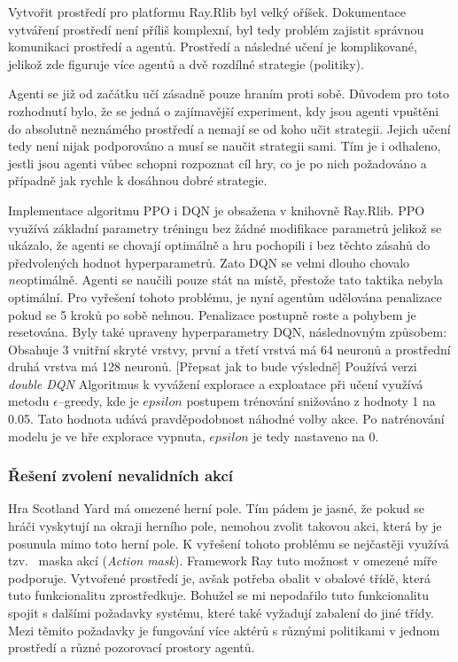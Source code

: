 Vytvořit prostředí pro platformu Ray.Rlib byl velký oříšek.
Dokumentace vytváření prostředí není příliš komplexní, byl tedy problém zajistit správnou komunikaci prostředí a agentů.
Prostředí a následné učení je komplikované, jelikož zde figuruje více agentů a dvě rozdílné strategie (politiky).

Agenti se již od začátku učí zásadně pouze hraním proti sobě.
Důvodem pro toto rozhodnutí bylo, že se jedná o zajímavější experiment, kdy jsou agenti vpuštěni do absolutně neznámého prostředí a nemají se od koho učit strategii.
Jejich učení tedy není nijak podporováno a musí se naučit strategii sami.
Tím je i odhaleno, jestli jsou agenti vůbec schopni rozpoznat cíl hry, co je po nich požadováno a případně jak rychle k dosáhnou dobré strategie.

Implementace algoritmu PPO i DQN je obsažena v knihovně Ray.Rlib.
PPO využívá základní parametry tréningu bez žádné modifikace parametrů jelikož se ukázalo, že agenti se chovají optimálně a hru pochopili i bez těchto zásahů do předvolených hodnot hyperparametrů.
Zato DQN se velmi dlouho chovalo \emph{ne}optimálně.
Agenti se naučili pouze stát na místě, přestože tato taktika nebyla optimální.
Pro vyřešení tohoto problému, je nyní agentům udělována penalizace pokud se 5 kroků po sobě nehnou.
Penalizace postupně roste a pohybem je resetována.
Byly také upraveny hyperparametry DQN, následnovným způsobem:
Obsahuje 3 vnitřní skryté vrstvy, první a třetí vrstvá má 64 neuronů a prostřední druhá vrstva má 128 neuronů.{\color {red} [Přepsat jak to bude výsledně]}
Používá verzi \emph{double DQN}
Algoritmus k vyvážení explorace a exploatace při učení využívá metodu $\epsilon$--greedy, kde je $epsilon$ postupem trénování snižováno z hodnoty 1 na 0.05.
Tato hodnota udává pravděpodobnost náhodné volby akce.
Po natrénování modelu je ve hře explorace vypnuta, $epsilon$ je tedy nastaveno na 0.

\subsubsection*{Řešení zvolení nevalidních akcí}

Hra Scotland Yard má omezené herní pole.
Tím pádem je jasné, že pokud se hráči vyskytují na okraji herního pole, nemohou zvolit takovou akci, která by je posunula mimo toto herní pole.
K vyřešení tohoto problému se nejčastěji využívá tzv.~ maska akcí (\emph{Action mask}).
Framework Ray tuto možnost v omezené míře podporuje.
Vytvořené prostředí je, avšak potřeba obalit v obalové třídě, která tuto funkcionalitu zprostředkuje.
Bohužel se mi nepodařilo tuto funkcionalitu spojit s dalšími požadavky systému, které také vyžadují zabalení do jiné třídy.
Mezi těmito požadavky je fungování více aktérů s různými politikami v jednom prostředí a různé pozorovací prostory agentů.


